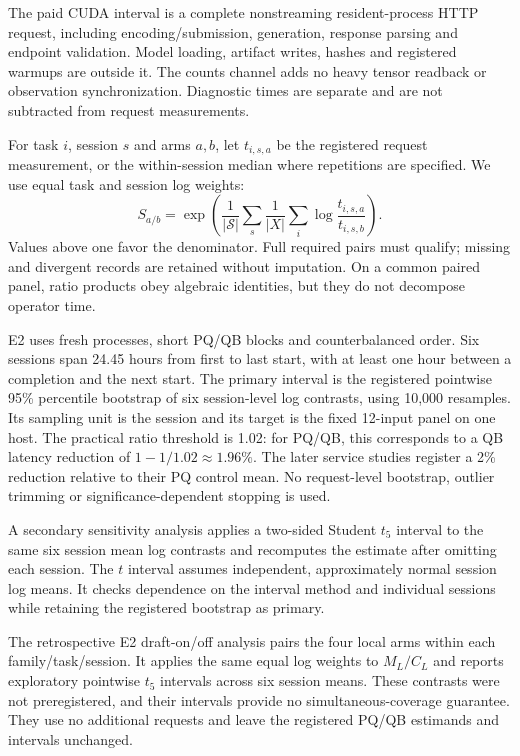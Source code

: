 The paid CUDA interval is a complete nonstreaming resident-process HTTP request, including encoding/submission, generation, response parsing and endpoint validation. Model loading, artifact writes, hashes and registered warmups are outside it. The counts channel adds no heavy tensor readback or observation synchronization. Diagnostic times are separate and are not subtracted from request measurements.

For task $i$, session $s$ and arms $a,b$, let $t_{i,s,a}$ be the registered request measurement, or the within-session median where repetitions are specified. We use equal task and session log weights:
\begin{equation}
S_{a/b}=\exp\!\left(\frac{1}{|\mathcal S|}\sum_s\frac{1}{|X|}\sum_i\log\frac{t_{i,s,a}}{t_{i,s,b}}\right).
\label{eq:ratio}
\end{equation}
Values above one favor the denominator. Full required pairs must qualify; missing and divergent records are retained without imputation. On a common paired panel, ratio products obey algebraic identities, but they do not decompose operator time.

E2 uses fresh processes, short PQ/QB blocks and counterbalanced order. Six sessions span 24.45 hours from first to last start, with at least one hour between a completion and the next start. The primary interval is the registered pointwise 95\% percentile bootstrap of six session-level log contrasts, using 10,000 resamples. Its sampling unit is the session and its target is the fixed 12-input panel on one host. The practical ratio threshold is 1.02: for PQ/QB, this corresponds to a QB latency reduction of $1-1/1.02\approx1.96\%$. The later service studies register a 2\% reduction relative to their PQ control mean. No request-level bootstrap, outlier trimming or significance-dependent stopping is used.

A secondary sensitivity analysis applies a two-sided Student $t_5$ interval to the same six session mean log contrasts and recomputes the estimate after omitting each session. The $t$ interval assumes independent, approximately normal session log means. It checks dependence on the interval method and individual sessions while retaining the registered bootstrap as primary.

The retrospective E2 draft-on/off analysis pairs the four local arms within each family/task/session. It applies the same equal log weights to $M_L/C_L$ and reports exploratory pointwise $t_5$ intervals across six session means. These contrasts were not preregistered, and their intervals provide no simultaneous-coverage guarantee. They use no additional requests and leave the registered PQ/QB estimands and intervals unchanged.

